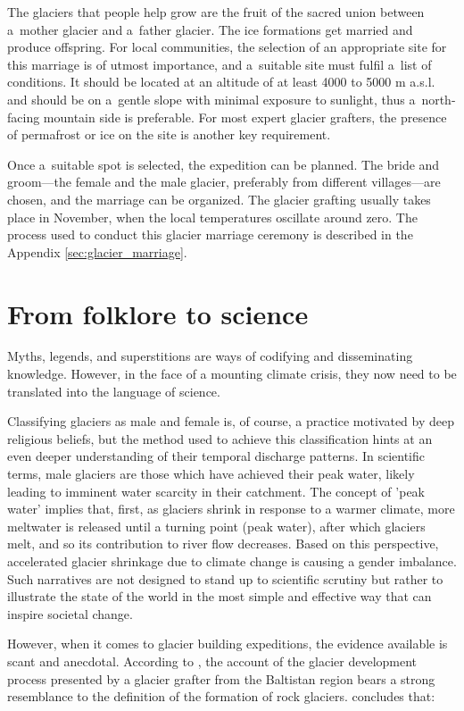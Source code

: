 The glaciers that people help grow are the fruit of the sacred union between a mother glacier and a father
glacier. The ice formations get married and produce offspring. For local communities, the selection of an
appropriate site for this marriage is of utmost importance, and a suitable site must fulfil a list of
conditions. It should be located at an altitude of at least 4000 to 5000 m \ac{a.s.l.} and should be on a gentle
slope with minimal exposure to sunlight, thus a north-facing mountain side is preferable. For most expert
glacier grafters, the presence of permafrost or ice on the site is another key requirement. 

Once a suitable spot is selected, the expedition can be planned. The bride and groom---the female and the male
glacier, preferably from different villages---are chosen, and the marriage can be organized. The glacier
grafting usually takes place in November, when the local temperatures oscillate around zero. The process used to
conduct this glacier marriage ceremony is described in the Appendix \ref{sec:glacier_marriage}.

\section{From folklore to science}

Myths, legends, and superstitions are ways of codifying and disseminating knowledge. However, in the face of a
mounting climate crisis, they now need to be translated into the language of science. 

Classifying glaciers as male and female is, of course, a practice motivated by deep religious beliefs, but the
method used to achieve this classification hints at an even deeper understanding of their temporal discharge
patterns. In scientific terms, male glaciers are those which have achieved their peak water, likely leading to
imminent water scarcity in their catchment. The concept of 'peak water' implies that, first, as glaciers shrink
in response to a warmer climate, more meltwater is released until a turning point (peak water), after which
glaciers melt, and so its contribution to river flow decreases. Based on this perspective, accelerated glacier
shrinkage due to climate change is causing a gender imbalance. Such narratives are not designed to stand up to
scientific scrutiny but rather to illustrate the state of the world in the most simple and effective way that
can inspire societal change. 

However, when it comes to glacier building expeditions, the evidence available is scant and anecdotal. According
to \citet{tveitenGlacierGrowingLocal2007}, the account of the glacier development process presented by a glacier
grafter from the Baltistan region bears a strong resemblance to the definition of the formation of rock
glaciers. \citet{tveitenGlacierGrowingLocal2007} concludes that: 

